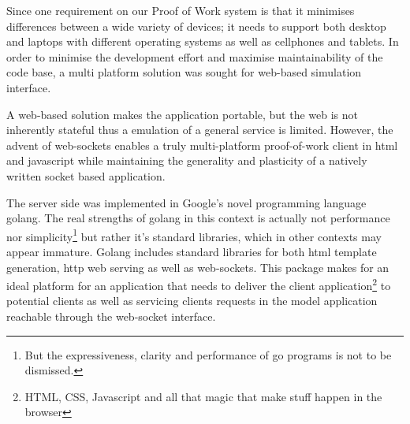 
Since one requirement on our Proof of Work system is that it minimises differences between a wide variety of devices; it needs to support both desktop and laptops with different operating systems as well as cellphones and tablets.
In order to minimise the development effort and maximise maintainability of the code base, a multi platform solution was sought for web-based simulation interface. 

A web-based solution makes the application portable, but the web is not inherently stateful thus a emulation of a general service is limited. However, the advent of web-sockets enables a truly multi-platform proof-of-work client in html and javascript while maintaining the generality and plasticity of a natively written socket based application. 
\begin{comment}
The javascript implementation for handling the protocol is quite simple:
The solution finding part also need to be presented:
To trigger a request to be sent to the server we build the following function which is then registered to the onclick event of a button in the web gui:

\end{comment}

The server side was implemented in Google's novel programming language golang\cite{golang}. The real strengths of golang in this context is actually not performance nor simplicity\footnote{But the expressiveness, clarity and performance of go programs is not to be dismissed.} but rather it's standard libraries, which in other contexts may appear immature. Golang includes standard libraries for both html template generation, http web serving as well as web-sockets. This package makes for an ideal platform for an application that needs to deliver the client application\footnote{HTML, CSS, Javascript and all that magic that make stuff happen in the browser} to potential clients as well as servicing clients requests in the model application reachable through the web-socket interface. 

